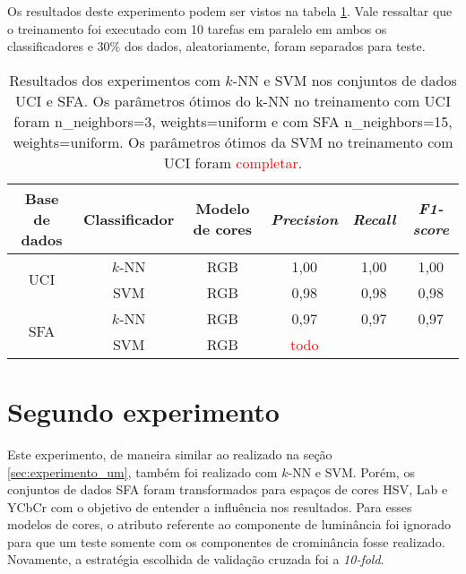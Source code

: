 Os resultados deste experimento podem ser vistos na tabela \ref{tab:resultados_experimento_um}. Vale ressaltar que o treinamento foi executado com 10 tarefas em paralelo em ambos os classificadores e 30\% dos dados, aleatoriamente, foram separados para teste.
\begin{table}[!htpb]
\centering
\begin{small}
\setlength{\tabcolsep}{8pt}

\begin{tabular}{|c|c|c|c|c|c|}\hline
 Base de dados & Classificador & Modelo de cores & \emph{Precision} & \emph{Recall} & \emph{F1-score} \\ \hline
 \multirow{2}{*}{UCI} & $k$-NN & RGB & 1,00 & 1,00 & 1,00 \\ \cline{2-6}
                      & SVM    & RGB & 0,98 & 0,98 & 0,98 \\ \hline
 \multirow{2}{*}{SFA} & $k$-NN & RGB & 0,97 & 0,97 & 0,97 \\ \cline{2-6}
                      & SVM    & RGB & \textcolor{red}{todo} && \\ \hline

\end{tabular}
\end{small}
\caption[Resultados dos experimentos com $k$-NN e SVM nos conjuntos de dados UCI e SFA]{Resultados dos experimentos com $k$-NN e SVM nos conjuntos de dados UCI e SFA. Os parâmetros ótimos do k-NN no treinamento com UCI foram n\_neighbors=3, weights=uniform e com SFA n\_neighbors=15, weights=uniform. Os parâmetros ótimos da SVM no treinamento com UCI foram \textcolor{red}{completar}.}
\label{tab:resultados_experimento_um}
\end{table}


\section{Segundo experimento}
\label{sec:experimento_dois}
Este experimento, de maneira similar ao realizado na seção \ref{sec:experimento_um}, também foi realizado com $k$-NN e SVM. Porém, os conjuntos de dados SFA foram transformados para espaços de cores HSV, Lab e YCbCr com o objetivo de entender a influência nos resultados. Para esses modelos de cores, o atributo referente ao componente de luminância foi ignorado para que um teste somente com os componentes de crominância fosse realizado. Novamente, a estratégia escolhida de validação cruzada foi a \emph{10-fold}.

